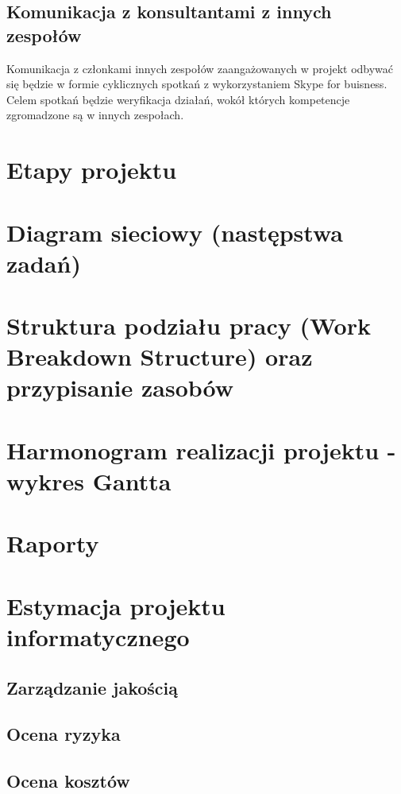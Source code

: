 \section{Komunikacja z konsultantami z innych zespołów}
Komunikacja z członkami innych zespołów zaangażowanych w projekt odbywać się będzie w formie cyklicznych spotkań z wykorzystaniem Skype for buisness. Celem spotkań będzie weryfikacja działań, wokół których kompetencje zgromadzone są w innych zespołach.
\chapter{Etapy projektu}
\chapter{Diagram sieciowy (następstwa zadań)}
\chapter{Struktura podziału pracy (Work Breakdown Structure) oraz przypisanie zasobów}
\chapter{Harmonogram realizacji projektu -  wykres Gantta}
\chapter{Raporty}
\chapter{Estymacja projektu informatycznego}
\section{Zarządzanie jakością}
\section{Ocena ryzyka}
\section{Ocena kosztów}








